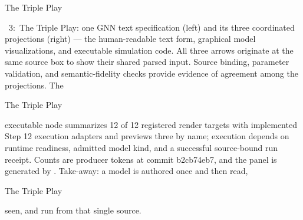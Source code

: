 \documentclass[
  ignorenonframetext,
]{beamer}
\newenvironment{archivecaptionframe}{\par\begingroup}{\par\endgroup}
\begin{document}
\begin{frame}{The Triple Play}

\begin{archivecaptionframe}

\figurename~3:\ The
Triple Play: one GNN text specification (left) and its three coordinated
projections (right) --- the human-readable text form, graphical model
visualizations, and executable simulation code. All three arrows
originate at the same source box to show their shared parsed input.
Source binding, parameter validation, and semantic-fidelity checks
provide evidence of agreement among the projections. The

\end{archivecaptionframe}

\end{frame}

\begin{frame}{The Triple Play}

\begin{archivecaptionframe}

executable node summarizes 12 of 12 registered render targets with
implemented Step 12 execution adapters and previews three by name;
execution depends on runtime readiness, admitted model kind, and a
successful source-bound run receipt. Counts are producer tokens at
commit b2cb74eb7, and the panel is generated by
. Take-away: a model is
authored once and then read,

\end{archivecaptionframe}

\end{frame}

\begin{frame}{The Triple Play}

\begin{archivecaptionframe}

seen, and run from that single source.

\end{archivecaptionframe}

\end{frame}
\end{document}
